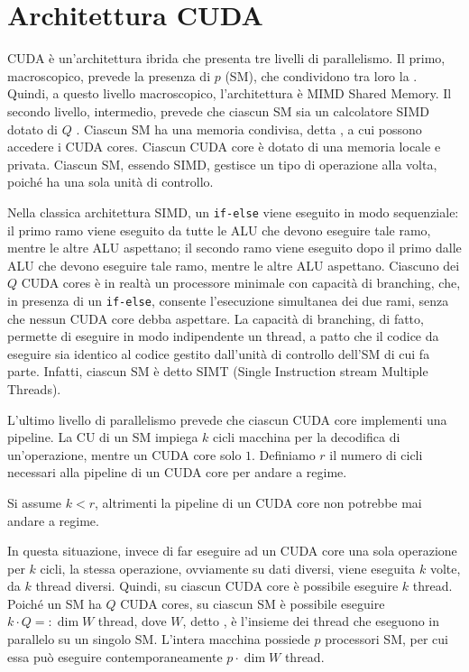 \section{Architettura CUDA}
CUDA è un'architettura ibrida che presenta tre livelli di parallelismo. Il primo, macroscopico, prevede la presenza di $p$  (SM), che condividono tra loro la . Quindi, a questo livello macroscopico, l'architettura è MIMD Shared Memory. Il secondo livello, intermedio, prevede che ciascun SM sia un calcolatore SIMD dotato di $Q$ . Ciascun SM ha una memoria condivisa, detta , a cui possono accedere i CUDA cores. Ciascun CUDA core è dotato di una memoria locale e privata. Ciascun SM, essendo SIMD, gestisce un tipo di operazione alla volta, poiché ha una sola unità di controllo.

\begin{observation}{}
Nella classica architettura SIMD, un \texttt{if-else} viene eseguito in modo sequenziale: il primo ramo viene eseguito da tutte le ALU che devono eseguire tale ramo, mentre le altre ALU aspettano; il secondo ramo viene eseguito dopo il primo dalle ALU che devono eseguire tale ramo, mentre le altre ALU aspettano. 
Ciascuno dei $Q$ CUDA cores è in realtà un processore minimale con capacità di branching, che, in presenza di un \texttt{if-else}, consente l'esecuzione simultanea dei due rami, senza che nessun CUDA core debba aspettare.
La capacità di branching, di fatto, permette di eseguire in modo indipendente un thread, a patto che il codice da eseguire sia identico al codice gestito dall'unità di controllo dell'SM di cui fa parte.
Infatti, ciascun SM è detto SIMT (Single Instruction stream Multiple Threads).
\end{observation}

L'ultimo livello di parallelismo prevede che ciascun CUDA core implementi una pipeline. La CU di un SM impiega $k$ cicli macchina per la decodifica di un'operazione, mentre un CUDA core solo $1$. Definiamo $r$ il numero di cicli necessari alla pipeline di un CUDA core per andare a regime.

\begin{note}{}
Si assume $k<r$, altrimenti la pipeline di un CUDA core non potrebbe mai andare a regime.
\end{note}

In questa situazione, invece di far eseguire ad un CUDA core una sola operazione per $k$ cicli, la stessa operazione, ovviamente su dati diversi, viene eseguita $k$ volte, da $k$ thread diversi. Quindi, su ciascun CUDA core è possibile eseguire $k$ thread. Poiché un SM ha $Q$ CUDA cores, su ciascun SM è possibile eseguire $k\cdot Q=:\dim W$ thread, dove $W$, detto , è l'insieme dei thread che eseguono in parallelo su un singolo SM. L'intera macchina possiede $p$ processori SM, per cui essa può eseguire contemporaneamente $p\cdot \dim W$ thread.

